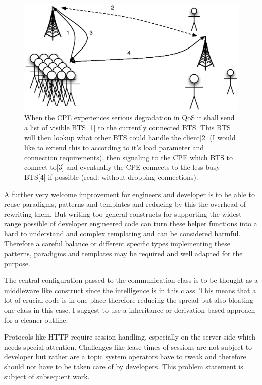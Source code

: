 \documentclass[twocolumn,english]{IEEEtran}
\theoremstyle{plain}
\theoremstyle{plain}
\begin{document}
\begin{figure}[h]
\includegraphics[width=\columnwidth]{Handover-to-less-frequented-cell.eps}
\caption{When the CPE experiences serious degradation in QoS it shall send a
list of visible BTS [1] to the currently connected BTS. This BTS will then
lookup what other BTS could handle the client[2] (I would like to extend this
to according to it's load parameter and connection requirements), then
signaling to the CPE which BTS to connect to[3] and eventually the CPE
connects to the less busy BTS[4] if possible (read: without dropping
connections).}
\label{fig:handover}
\end{figure}

A further very welcome improvement for engineers and developer is to be able
to reuse paradigms, patterns and templates and reducing by this the overhead
of rewriting them. But writing too general constructs for supporting the
widest range possible of developer engineered code can turn these helper
functions into a hard to understand and complex templating and can be
considered harmful. Therefore a careful balance or different specific types
implementing these patterns, paradigms and templates may be required and well
adapted for the purpose.

The central configuration passed to the communication class is to be thought
as a middleware like construct since the intelligence is in this
class. This means that a lot of crucial code is in one place therefore
reducing the spread but also bloating one class in this case. I suggest to
use a inheritance or derivation based approach for a cleaner outline.

Protocols like HTTP require session handling, especially on the server side
which needs special attention. Challenges like lease times of sessions are
not subject to developer but rather are a topic system operators have to
tweak and therefore should not have to be taken care of by developers. This
problem statement is subject of subsequent work.
\end{document}
